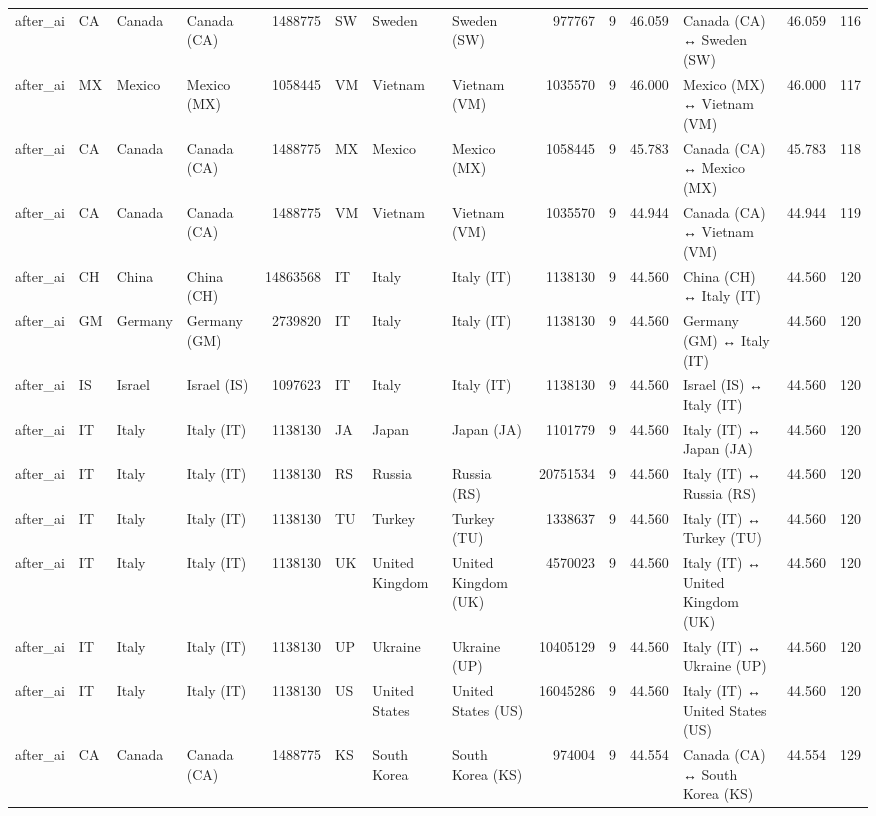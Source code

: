 \begin{tabular}{llllrlllrrrlrr}
after\_ai & CA & Canada & Canada (CA) & 1488775 & SW & Sweden & Sweden (SW) & 977767 & 9 & 46.059 & Canada (CA) ↔ Sweden (SW) & 46.059 & 116 \\
after\_ai & MX & Mexico & Mexico (MX) & 1058445 & VM & Vietnam & Vietnam (VM) & 1035570 & 9 & 46.000 & Mexico (MX) ↔ Vietnam (VM) & 46.000 & 117 \\
after\_ai & CA & Canada & Canada (CA) & 1488775 & MX & Mexico & Mexico (MX) & 1058445 & 9 & 45.783 & Canada (CA) ↔ Mexico (MX) & 45.783 & 118 \\
after\_ai & CA & Canada & Canada (CA) & 1488775 & VM & Vietnam & Vietnam (VM) & 1035570 & 9 & 44.944 & Canada (CA) ↔ Vietnam (VM) & 44.944 & 119 \\
after\_ai & CH & China & China (CH) & 14863568 & IT & Italy & Italy (IT) & 1138130 & 9 & 44.560 & China (CH) ↔ Italy (IT) & 44.560 & 120 \\
after\_ai & GM & Germany & Germany (GM) & 2739820 & IT & Italy & Italy (IT) & 1138130 & 9 & 44.560 & Germany (GM) ↔ Italy (IT) & 44.560 & 120 \\
after\_ai & IS & Israel & Israel (IS) & 1097623 & IT & Italy & Italy (IT) & 1138130 & 9 & 44.560 & Israel (IS) ↔ Italy (IT) & 44.560 & 120 \\
after\_ai & IT & Italy & Italy (IT) & 1138130 & JA & Japan & Japan (JA) & 1101779 & 9 & 44.560 & Italy (IT) ↔ Japan (JA) & 44.560 & 120 \\
after\_ai & IT & Italy & Italy (IT) & 1138130 & RS & Russia & Russia (RS) & 20751534 & 9 & 44.560 & Italy (IT) ↔ Russia (RS) & 44.560 & 120 \\
after\_ai & IT & Italy & Italy (IT) & 1138130 & TU & Turkey & Turkey (TU) & 1338637 & 9 & 44.560 & Italy (IT) ↔ Turkey (TU) & 44.560 & 120 \\
after\_ai & IT & Italy & Italy (IT) & 1138130 & UK & United Kingdom & United Kingdom (UK) & 4570023 & 9 & 44.560 & Italy (IT) ↔ United Kingdom (UK) & 44.560 & 120 \\
after\_ai & IT & Italy & Italy (IT) & 1138130 & UP & Ukraine & Ukraine (UP) & 10405129 & 9 & 44.560 & Italy (IT) ↔ Ukraine (UP) & 44.560 & 120 \\
after\_ai & IT & Italy & Italy (IT) & 1138130 & US & United States & United States (US) & 16045286 & 9 & 44.560 & Italy (IT) ↔ United States (US) & 44.560 & 120 \\
after\_ai & CA & Canada & Canada (CA) & 1488775 & KS & South Korea & South Korea (KS) & 974004 & 9 & 44.554 & Canada (CA) ↔ South Korea (KS) & 44.554 & 129 \\

\end{tabular}
